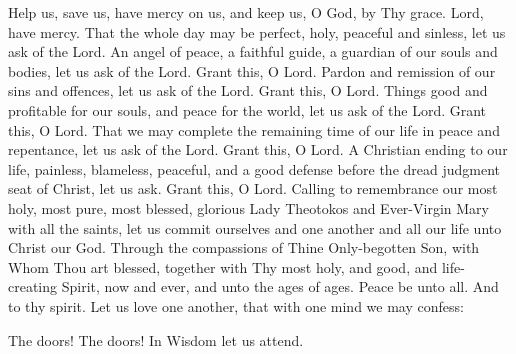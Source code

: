 \begin{liturgicaltext}
    \deacon Help us, save us, have mercy on us, and keep us, O God, by Thy grace.
    \choir Lord, have mercy.
    \deacon That the whole day may be perfect, holy, peaceful and sinless, let us ask of the Lord.
    \choir {}
    \deacon An angel of peace, a faithful guide, a guardian of our souls and bodies, let us ask of the Lord. 
    \choir Grant this, O Lord.
    \deacon Pardon and remission of our sins and offences, let us ask of the Lord.
    \choir Grant this, O Lord.
    \deacon Things good and profitable for our souls, and peace for the world, let us ask of the Lord.
    \choir Grant this, O Lord.
    \deacon That we may complete the remaining time of our life in peace and repentance, let us ask of the Lord.
    \choir Grant this, O Lord.
    \deacon A Christian ending to our life, painless, blameless, peaceful, and a good defense before the dread judgment seat of Christ, let us ask.
    \choir Grant this, O Lord. \pagebreak
    \deacon Calling to remembrance our most holy, most pure, most blessed, glorious Lady Theotokos and Ever-Virgin Mary with all the saints, let us commit ourselves and one another and all our life unto Christ our God.
    \choir {}
    \priest Through the compassions of Thine Only-begotten Son, with Whom Thou art blessed, together with Thy most holy, and good, and life-creating Spirit, now and ever, and unto the ages of ages. 
    \choir {}
    \priest Peace be unto all.
    \choir And to thy spirit.
    \priest Let us love one another, that with one mind we may confess: \newpage
    \choir 
\end{liturgicaltext}
\begin{liturgicaltext}
    \deacon The doors! The doors! In Wisdom let us attend. 
\end{liturgicaltext}